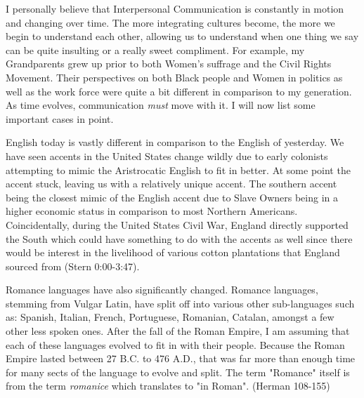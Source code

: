 \documentclass[12pt]{article}
\begin{document}
\par
I personally believe that Interpersonal Communication is constantly in motion and changing over time. The more integrating cultures become, the more we begin to understand each other, allowing us to understand when one thing we say can be quite insulting or a really sweet compliment. For example, my Grandparents grew up prior to both Women's suffrage and the Civil Rights Movement. Their perspectives on  both Black people and Women in politics as well as the work force were quite a bit different in comparison to my generation. As time evolves, communication \emph{must} move with it. I will now list some important cases in point.
\par
English today is vastly different in comparison to the English of yesterday. We have seen accents in the United States change wildly due to early colonists attempting to mimic the Aristrocatic English to fit in better. At some point the accent stuck, leaving us with a relatively unique accent. The southern accent being the closest mimic of the English accent due to Slave Owners being in a higher economic status in comparison to most Northern Americans. Coincidentally, during the United States Civil War, England directly supported the South which could have something to do with the accents as well since there would be interest in the livelihood of various cotton plantations that England sourced from (Stern 0:00-3:47). 
\par
Romance languages have also significantly changed. Romance languages, stemming from Vulgar Latin, have split off into various other sub-languages such as: Spanish, Italian, French, Portuguese, Romanian, Catalan, amongst a few other less spoken ones. After the fall of the Roman Empire, I am assuming that each of these languages evolved to fit in with their people. Because the Roman Empire lasted between 27 B.C. to 476 A.D., that was far more than enough time for many sects of the language to evolve and split. The term "Romance" itself is from the term \textit{romanice} which translates to "in Roman". (Herman 108-155) 
\end{document}
